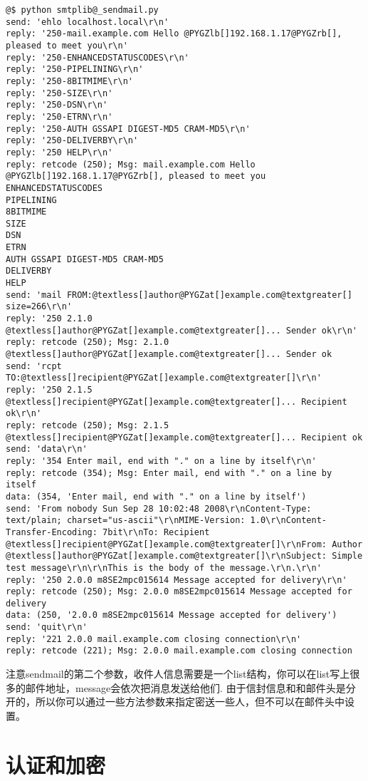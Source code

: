\documentclass[a4paper,10pt,english]{manual}
\begin{document}
\begin{Verbatim}[commandchars=@\[\]]
@$ python smtplib@_sendmail.py
send: 'ehlo localhost.local\r\n'
reply: '250-mail.example.com Hello @PYGZlb[]192.168.1.17@PYGZrb[], pleased to meet you\r\n'
reply: '250-ENHANCEDSTATUSCODES\r\n'
reply: '250-PIPELINING\r\n'
reply: '250-8BITMIME\r\n'
reply: '250-SIZE\r\n'
reply: '250-DSN\r\n'
reply: '250-ETRN\r\n'
reply: '250-AUTH GSSAPI DIGEST-MD5 CRAM-MD5\r\n'
reply: '250-DELIVERBY\r\n'
reply: '250 HELP\r\n'
reply: retcode (250); Msg: mail.example.com Hello @PYGZlb[]192.168.1.17@PYGZrb[], pleased to meet you
ENHANCEDSTATUSCODES
PIPELINING
8BITMIME
SIZE
DSN
ETRN
AUTH GSSAPI DIGEST-MD5 CRAM-MD5
DELIVERBY
HELP
send: 'mail FROM:@textless[]author@PYGZat[]example.com@textgreater[] size=266\r\n'
reply: '250 2.1.0 @textless[]author@PYGZat[]example.com@textgreater[]... Sender ok\r\n'
reply: retcode (250); Msg: 2.1.0 @textless[]author@PYGZat[]example.com@textgreater[]... Sender ok
send: 'rcpt TO:@textless[]recipient@PYGZat[]example.com@textgreater[]\r\n'
reply: '250 2.1.5 @textless[]recipient@PYGZat[]example.com@textgreater[]... Recipient ok\r\n'
reply: retcode (250); Msg: 2.1.5 @textless[]recipient@PYGZat[]example.com@textgreater[]... Recipient ok
send: 'data\r\n'
reply: '354 Enter mail, end with "." on a line by itself\r\n'
reply: retcode (354); Msg: Enter mail, end with "." on a line by itself
data: (354, 'Enter mail, end with "." on a line by itself')
send: 'From nobody Sun Sep 28 10:02:48 2008\r\nContent-Type: text/plain; charset="us-ascii"\r\nMIME-Version: 1.0\r\nContent-Transfer-Encoding: 7bit\r\nTo: Recipient @textless[]recipient@PYGZat[]example.com@textgreater[]\r\nFrom: Author @textless[]author@PYGZat[]example.com@textgreater[]\r\nSubject: Simple test message\r\n\r\nThis is the body of the message.\r\n.\r\n'
reply: '250 2.0.0 m8SE2mpc015614 Message accepted for delivery\r\n'
reply: retcode (250); Msg: 2.0.0 m8SE2mpc015614 Message accepted for delivery
data: (250, '2.0.0 m8SE2mpc015614 Message accepted for delivery')
send: 'quit\r\n'
reply: '221 2.0.0 mail.example.com closing connection\r\n'
reply: retcode (221); Msg: 2.0.0 mail.example.com closing connection
\end{Verbatim}

注意sendmail的第二个参数，收件人信息需要是一个list结构，你可以在list写上很多的邮件地址，message会依次把消息发送给他们. 由于信封信息和和邮件头是分开的，所以你可以通过一些方法参数来指定密送一些人，但不可以在邮件头中设置。


\section{认证和加密}
\end{document}
